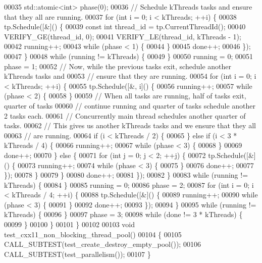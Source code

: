 \begin{DoxyCode}
00035     std::atomic<int> phase(0);
00036     \textcolor{comment}{// Schedule kThreads tasks and ensure that they all are running.}
00037     \textcolor{keywordflow}{for} (\textcolor{keywordtype}{int} i = 0; i < kThreads; ++i) \{
00038       tp.Schedule([&]() \{
00039         \textcolor{keyword}{const} \textcolor{keywordtype}{int} thread\_id = tp.CurrentThreadId();
00040         VERIFY\_GE(thread\_id, 0);
00041         VERIFY\_LE(thread\_id, kThreads - 1);
00042         running++;
00043         \textcolor{keywordflow}{while} (phase < 1) \{
00044         \}
00045         done++;
00046       \});
00047     \}
00048     \textcolor{keywordflow}{while} (running != kThreads) \{
00049     \}
00050     running = 0;
00051     phase = 1;
00052     \textcolor{comment}{// Now, while the previous tasks exit, schedule another kThreads tasks and}
00053     \textcolor{comment}{// ensure that they are running.}
00054     \textcolor{keywordflow}{for} (\textcolor{keywordtype}{int} i = 0; i < kThreads; ++i) \{
00055       tp.Schedule([&, i]() \{
00056         running++;
00057         \textcolor{keywordflow}{while} (phase < 2) \{
00058         \}
00059         \textcolor{comment}{// When all tasks are running, half of tasks exit, quarter of tasks}
00060         \textcolor{comment}{// continue running and quarter of tasks schedule another 2 tasks each.}
00061         \textcolor{comment}{// Concurrently main thread schedules another quarter of tasks.}
00062         \textcolor{comment}{// This gives us another kThreads tasks and we ensure that they all}
00063         \textcolor{comment}{// are running.}
00064         \textcolor{keywordflow}{if} (i < kThreads / 2) \{
00065         \} \textcolor{keywordflow}{else} \textcolor{keywordflow}{if} (i < 3 * kThreads / 4) \{
00066           running++;
00067           \textcolor{keywordflow}{while} (phase < 3) \{
00068           \}
00069           done++;
00070         \} \textcolor{keywordflow}{else} \{
00071           \textcolor{keywordflow}{for} (\textcolor{keywordtype}{int} j = 0; j < 2; ++j) \{
00072             tp.Schedule([&]() \{
00073               running++;
00074               \textcolor{keywordflow}{while} (phase < 3) \{
00075               \}
00076               done++;
00077             \});
00078           \}
00079         \}
00080         done++;
00081       \});
00082     \}
00083     \textcolor{keywordflow}{while} (running != kThreads) \{
00084     \}
00085     running = 0;
00086     phase = 2;
00087     \textcolor{keywordflow}{for} (\textcolor{keywordtype}{int} i = 0; i < kThreads / 4; ++i) \{
00088       tp.Schedule([&]() \{
00089         running++;
00090         \textcolor{keywordflow}{while} (phase < 3) \{
00091         \}
00092         done++;
00093       \});
00094     \}
00095     \textcolor{keywordflow}{while} (running != kThreads) \{
00096     \}
00097     phase = 3;
00098     \textcolor{keywordflow}{while} (done != 3 * kThreads) \{
00099     \}
00100   \}
00101 \}
00102 
00103 \textcolor{keywordtype}{void} test\_cxx11\_non\_blocking\_thread\_pool()
00104 \{
00105   CALL\_SUBTEST(test\_create\_destroy\_empty\_pool());
00106   CALL\_SUBTEST(test\_parallelism());
00107 \}
\end{DoxyCode}
